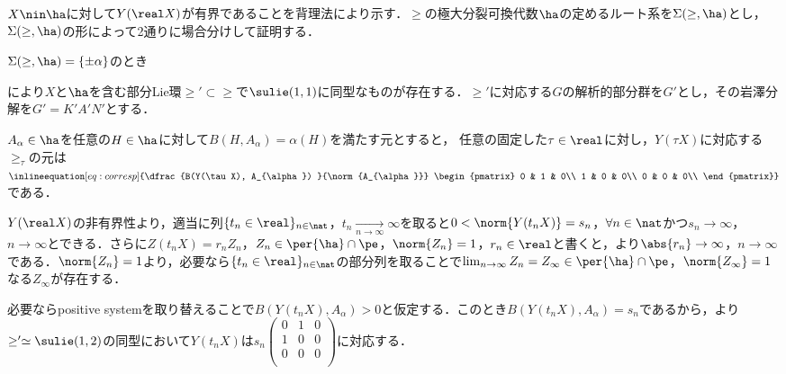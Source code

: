 \begin{pfwn}{}

  $X\nin \ha$に対して$Y(\real X)$が有界であることを背理法により示す．$\ge$の極大分裂可換代数$\ha$の定めるルート系を$\Sigma(\ge,\ha) $とし，$\Sigma(\ge,\ha) $の形によって2通りに場合分けして証明する．
  
  \begin{case}
    $\Sigma(\ge,\ha) = \{\pm\alpha \}$のとき


    により$X$と$\ha $を含む部分Lie環$\ge' \subset \ge $で$\sulie(1,1) $に同型なものが存在する．$\ge' $に対応する$G$の解析的部分群を$G'$とし，その岩澤分解を$G' = K'A'N' $とする．
    
    $A_{\alpha}\in \ha $を任意の$H\in \ha $に対して$B(H,A_{\alpha}) = \alpha(H) $を満たす元とすると， 任意の固定した$\tau \in \real$に対し，$Y(\tau X) $に対応する$\ge_{\tau} $の元は$\inlineequation[eq:corresp]{\dfrac{B(Y(\tau X), A_{\alpha}) }{\norm{A_{\alpha}}}
    \begin{pmatrix}
      0 & 1 & 0\\
      1 & 0 & 0\\
      0 & 0 & 0\\
    \end{pmatrix}}
    $である．
    
    $Y(\real X) $の非有界性より，適当に列$\{t_{n}\in \real\}_{n\in \nat} $，$t_n\underset{n\to \infty}{\to} \infty$を取ると$0 <  \norm{Y(t_n X)} = s_n $，$\forall n\in \nat$かつ$s_n\to \infty$，$n\to \infty$とできる．さらに$Z(t_n X) = r_n Z_n $，$Z_n\in \per{\ha}\cap \pe $，$\norm{Z_n} = 1 $，$r_n\in \real$と書くと，より$\abs{r_n}\to \infty$，$n\to \infty$である．$\norm{Z_n} = 1 $より，必要なら$\{t_{n}\in \real\}_{n\in \nat} $の部分列を取ることで$\lim_{n\to \infty}Z_n = Z_{\infty}\in \per{\ha}\cap \pe $，$\norm{Z_{\infty} } = 1$なる$Z_{\infty}$が存在する．

    必要ならpositive systemを取り替えることで$B(Y(t_n X), A_{\alpha}) > 0$と仮定する．このとき$B(Y(t_n X), A_{\alpha}) = s_n$であるから，より$\ge'\simeq \sulie(1,2) $の同型において$Y(t_n X)  $は$s_n\begin{pmatrix}
      0 & 1 & 0\\
      1 & 0 & 0\\
      0 & 0 & 0\\
    \end{pmatrix}$に対応する．


\end{case}
\end{pfwn}
